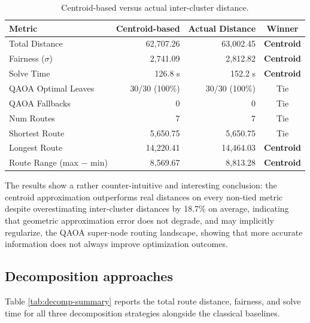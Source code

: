 \documentclass[a4paper]{report}
\begin{document}
{\begin{itemize}
\begin{itemize}
\begin{table}[h]
\centering
\begin{tabular}{|l|r|r|c|}
\hline
\textbf{Metric} & \textbf{Centroid-based} & \textbf{Actual Distance} & \textbf{Winner} \\
\hline
Total Distance & 62,707.26 & 63,002.45 & \textbf{Centroid} \\
Fairness ($\sigma$) & 2,741.09 & 2,812.82 & \textbf{Centroid} \\
Solve Time & 126.8 s & 152.2 s & \textbf{Centroid} \\
QAOA Optimal Leaves & 30/30 (100\%) & 30/30 (100\%) & Tie \\
QAOA Fallbacks & 0 & 0 & Tie \\
Num Routes & 7 & 7 & Tie \\
Shortest Route & 5,650.75 & 5,650.75 & Tie \\
Longest Route & 14,220.41 & 14,464.03 & \textbf{Centroid} \\
Route Range (max $-$ min) & 8,569.67 & 8,813.28 & \textbf{Centroid} \\
\hline
\end{tabular}
\caption{Centroid-based versus actual inter-cluster distance.}
\label{tab:exp2-centroid-vs-real}
\end{table}

The results show a rather counter-intuitive and interesting conclusion: the centroid approximation outperforms real distances on every non-tied metric despite overestimating inter-cluster distances by 18.7\% on average, indicating that geometric approximation error does not degrade, and may implicitly regularize, the QAOA super-node routing landscape, showing that more accurate information does not always improve optimization outcomes.\newline



\subsection{Decomposition approaches} 

Table \ref{tab:decomp-summary} reports the total route distance, fairness,  and solve time for all three decomposition strategies alongside the classical baselines.


\end{itemize}
\end{itemize}}
\end{document}

